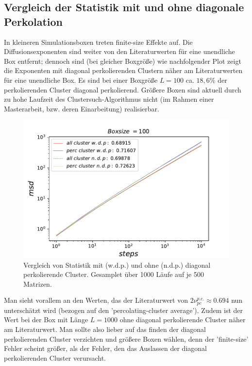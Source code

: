 \documentclass[a4paper, 12pt]{report}
\begin{document}
\subsection{Vergleich der Statistik mit und ohne diagonale Perkolation}
\noindent In kleineren Simulationsboxen treten finite-size Effekte auf. Die Diffusionsexponenten sind weiter von den Literaturwerten für eine unendliche Box entfernt; dennoch sind (bei gleicher Boxgröße) wie nachfolgender Plot zeigt die Exponenten mit diagonal perkolierenden Clustern näher am Literaturwerten für eine unendliche Box. Es sind bei einer Boxgröße $L=100$ ca. $18,6\%$ der perkolierenden Cluster diagonal perkolierend. Größere Boxen sind aktuell durch zu hohe Laufzeit des Clustersuch-Algorithmus nicht (im Rahmen einer Masterarbeit, bzw. deren Einarbeitung) realisierbar.
\begin{figure}[h!]
	\centering
	\includegraphics[scale=0.9]{both100.pdf}
	\caption{Vergleich von Statistik mit (w.d.p.) und ohne (n.d.p.) diagonal perkolierende Cluster. Gesamplet über 1000 Läufe auf je 500 Matrizen.}
\end{figure}

\noindent Man sieht vorallem an den Werten, das der Literaturwert von $2\nu_{pc}^{p.c.} \approx 0.694$ nun unterschätzt wird (bezogen auf den 'percolating-cluster average'). Zudem ist der Wert bei der Box mit Länge $L=1000$ ohne diagonal perkolierende Cluster näher am Literaturwert. Man sollte also lieber auf das finden der diagonal perkolierenden Cluster verzichten und größere Boxen wählen, denn der 'finite-size' Fehler scheint größer, als der Fehler, den das Auslassen der diagonal perkolierenden Cluster verursacht.
\end{document}
